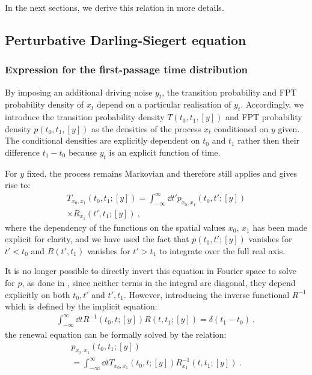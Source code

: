 \documentclass[%
 reprint,
superscriptaddress,
nofootinbib,
 amsmath,amssymb,
 aps,
prx,
]{revtex4-2}
\begin{document}
In the next sections, we derive this relation in more details.
\subsection{Perturbative Darling-Siegert equation}
\label{seq:perturbative_darling_siegert}

\subsubsection{Expression for the first-passage time distribution}
By imposing an additional driving noise $y_t$, the transition probability and FPT probability density of $x_t$  depend on a particular  realisation of $y_t$. Accordingly, we introduce the  transition probability density $T(t_0,t_1,[y]) $ and FPT probability density $p(t_0,t_1,[y]) $ as the densities of the process $x_t$ conditioned on  $y$ given. The conditional densities are explicitly dependent on $t_0$ and $t_1$ rather then their difference $t_1-t_0$ because $y_t$ is an explicit function of time.

For $y$ fixed, the process remains Markovian and therefore  still applies and gives rise to:
\begin{multline}
\label{eq:conditional_argument_2}
	T_{x_0,x_1}(t_0,t_1;[y])= 
	\int_{-\infty}^{\infty} \dd{t'} p_{x_0,x_1}(t_0,t';[y]) \\
	\times R_{x_1}(t',t_1;[y])~,
\end{multline}
where the dependency of the functions on the spatial values $x_0$, $x_1$ has been made explicit for clarity, and we have used the fact that $p(t_0, t';[y])$ vanishes for $t'<t_0$ and $R(t',t_1)$ vanishes for $t'>t_1$ to integrate over the full real axis.

It is no longer possible to directly invert this equation in Fourier space to solve for $p$, as done in , since neither terms in the integral are diagonal, \ie they depend explicitly on both $t_0, t'$ and $t', t_1$. However, introducing the inverse functional $R^{-1}$ which is defined by the implicit equation:
\begin{align}
\label{eq:def_inverse_R}
\int_{-\infty}^{\infty} \dd{t} R^{-1}(t_0, t;[y]) R(t, t_1;[y]) =\delta(t_1-t_0)~,
\end{align}
the renewal equation can be formally solved by the relation:
\begin{multline}
\label{eq:main_eq_to_solve}
p_{x_0,x_1}(t_0, t_1;[y])\\
=\int_{-\infty}^{\infty} \dd{t} T_{x_0,x_1}(t_0, t;[y])  R^{-1}_{x_1}(t,t_1;[y])~.
\end{multline}
\end{document}
